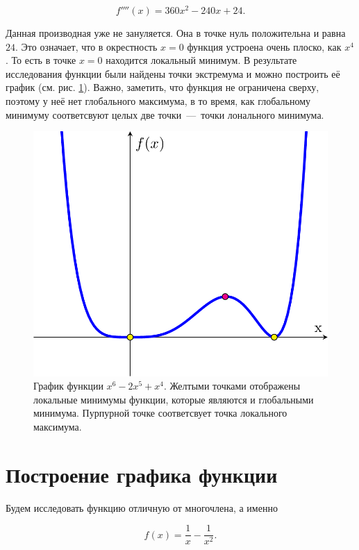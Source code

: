 \documentclass[12pt]{article}
\begin{document}
\begin{equation}
	f''''(x) = 360x^2-240x+24.
\end{equation}

Данная производная уже не зануляется. Она в точке нуль положительна и равна $24$. Это означает, что в окрестность $x=0$ функция устроена очень плоско, как $x^4$. То есть в точке $x=0$ находится локальный минимум. В результате исследования функции были найдены точки экстремума и можно построить её график (см. рис. \ref{fig:74}). Важно, заметить, что функция не ограничена сверху, поэтому у неё нет глобального максимума, в то время, как глобальному минимуму соответсвуют целых две точки~\----~точки лонального минимума. 

\begin{figure}[htbp]
	\centering
	\includegraphics[width=\linewidth]{fig9}
	\caption{График функции $x^6-2x^5+x^4$. Желтыми точками отображены локальные минимумы функции, которые являются и глобальными минимума. Пурпурной точке соответсвует точка локального максимума.}
	\label{fig:74}
\end{figure}

\section{Построение графика функции} %
Будем исследовать функцию отличную от многочлена, а именно

\begin{equation}
	f(x) = \dfrac{1}{x} - \dfrac{1}{x^2}.
\end{equation}
\end{document}
